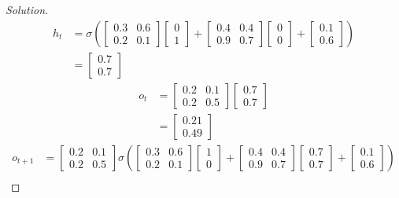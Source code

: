 \documentclass{article}
\begin{document}
\begin{proof}[Solution]
    \begin{align*}
        h_t & = \sigma \left( \begin{bmatrix} 0.3 & 0.6 \\ 0.2  & 0.1 \end{bmatrix} \begin{bmatrix} 0 \\ 1 \end{bmatrix} + \begin{bmatrix}0.4 & 0.4 \\ 0.9  & 0.7 \end{bmatrix}\begin{bmatrix} 0 \\ 0 \end{bmatrix} + \begin{bmatrix} 0.1 \\ 0.6 \end{bmatrix} \right) \\
        & = \begin{bmatrix} 0.7 \\ 0.7 \end{bmatrix}
    \end{align*}
    \begin{align*}
        o_t & = \begin{bmatrix} 0.2 & 0.1 \\ 0.2  & 0.5 \end{bmatrix} \begin{bmatrix} 0.7 \\ 0.7 \end{bmatrix} \\
        & = \begin{bmatrix} 0.21 \\ 0.49 \end{bmatrix}
    \end{align*}
    \begin{align*}
        o_{t + 1} & = \begin{bmatrix} 0.2 & 0.1 \\ 0.2  & 0.5 \end{bmatrix} \sigma \left( \begin{bmatrix} 0.3 & 0.6 \\ 0.2  & 0.1 \end{bmatrix} \begin{bmatrix} 1 \\ 0 \end{bmatrix} + \begin{bmatrix}0.4 & 0.4 \\ 0.9  & 0.7 \end{bmatrix}\begin{bmatrix} 0.7 \\ 0.7 \end{bmatrix} + \begin{bmatrix} 0.1 \\ 0.6 \end{bmatrix} \right) \\

\end{align*}
\end{proof}
\end{document}

